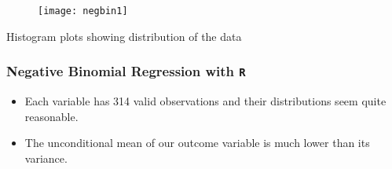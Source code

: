 \documentclass[MASTER.tex]{subfiles}
\begin{document}
\begin{frame}
\begin{figure}
\centering
\texttt{[image: negbin1]}
\end{figure}
Histogram plots showing distribution of the data
\end{frame}
\begin{frame}[fragile]
	\frametitle{Negative Binomial Regression with \texttt{R} }
	\Large


\begin{itemize}

\item Each variable has 314 valid observations and their distributions seem quite reasonable. 
\item The unconditional mean of our outcome variable is much lower than its variance.
\end{itemize}

\end{frame}
\end{document}
